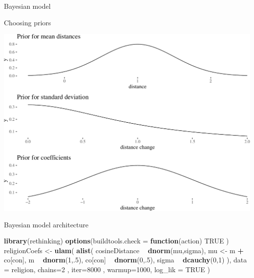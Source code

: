 \documentclass[10pt,ignorenonframetext,x11names, dvipsnames, bibspacing,natbib]{beamer}
\newenvironment{Shaded}{\begin{snugshade}}{\end{snugshade}}
\newcommand{\KeywordTok}[1]{\textcolor[rgb]{0.13,0.29,0.53}{\textbf{#1}}}
\newcommand{\DataTypeTok}[1]{\textcolor[rgb]{0.13,0.29,0.53}{#1}}
\newcommand{\DecValTok}[1]{\textcolor[rgb]{0.00,0.00,0.81}{#1}}
\newcommand{\StringTok}[1]{\textcolor[rgb]{0.31,0.60,0.02}{#1}}
\newcommand{\OtherTok}[1]{\textcolor[rgb]{0.56,0.35,0.01}{#1}}
\newcommand{\ControlFlowTok}[1]{\textcolor[rgb]{0.13,0.29,0.53}{\textbf{#1}}}
\newcommand{\OperatorTok}[1]{\textcolor[rgb]{0.81,0.36,0.00}{\textbf{#1}}}
\newcommand{\NormalTok}[1]{#1}
\begin{document}
\begin{frame}{Bayesian model}

\begin{block}{Choosing priors}

\begin{center}\includegraphics[width=1\linewidth]{presentationESSLLI_files/figure-beamer/priorsVis-1} \end{center}

\end{block}

\end{frame}

\begin{frame}[fragile]{Bayesian model architecture}

\vspace{1mm} \footnotesize

\begin{Shaded}
\begin{Highlighting}[]
\KeywordTok{library}\NormalTok{(rethinking)}
\KeywordTok{options}\NormalTok{(}\DataTypeTok{buildtools.check =} \ControlFlowTok{function}\NormalTok{(action) }\OtherTok{TRUE}\NormalTok{ )}
\NormalTok{religionCoefs <-}\StringTok{ }\KeywordTok{ulam}\NormalTok{(}
  \KeywordTok{alist}\NormalTok{(}
\NormalTok{    cosineDistance }\OperatorTok{~}\StringTok{ }\KeywordTok{dnorm}\NormalTok{(mu,sigma),}
\NormalTok{    mu <-}\StringTok{ }\NormalTok{m }\OperatorTok{+}\StringTok{ }\NormalTok{co[con],}
\NormalTok{    m }\OperatorTok{~}\StringTok{ }\KeywordTok{dnorm}\NormalTok{(}\DecValTok{1}\NormalTok{,.}\DecValTok{5}\NormalTok{),}
\NormalTok{    co[con] }\OperatorTok{~}\StringTok{ }\KeywordTok{dnorm}\NormalTok{(}\DecValTok{0}\NormalTok{,.}\DecValTok{5}\NormalTok{),}
\NormalTok{    sigma }\OperatorTok{~}\StringTok{ }\KeywordTok{dcauchy}\NormalTok{(}\DecValTok{0}\NormalTok{,}\DecValTok{1}\NormalTok{)}
\NormalTok{  ),}
  \DataTypeTok{data =}\NormalTok{ religion,}
  \DataTypeTok{chains=}\DecValTok{2}\NormalTok{ , }\DataTypeTok{iter=}\DecValTok{8000}\NormalTok{ , }\DataTypeTok{warmup=}\DecValTok{1000}\NormalTok{, }
  \DataTypeTok{log_lik =} \OtherTok{TRUE}
\NormalTok{)}
\end{Highlighting}
\end{Shaded}

\normalsize

\end{frame}
\end{document}
